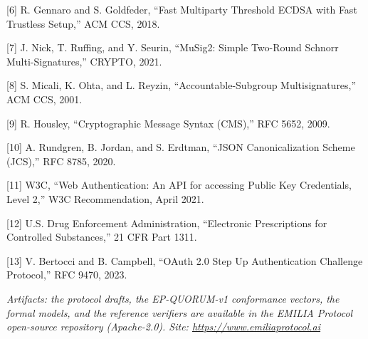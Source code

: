 \documentclass[
  11pt,
]{article}
\begin{document}
{[}6{]} R. Gennaro and S. Goldfeder, ``Fast Multiparty Threshold ECDSA
with Fast Trustless Setup,'' ACM CCS, 2018.

{[}7{]} J. Nick, T. Ruffing, and Y. Seurin, ``MuSig2: Simple Two-Round
Schnorr Multi-Signatures,'' CRYPTO, 2021.

{[}8{]} S. Micali, K. Ohta, and L. Reyzin, ``Accountable-Subgroup
Multisignatures,'' ACM CCS, 2001.

{[}9{]} R. Housley, ``Cryptographic Message Syntax (CMS),'' RFC 5652,
2009.

{[}10{]} A. Rundgren, B. Jordan, and S. Erdtman, ``JSON Canonicalization
Scheme (JCS),'' RFC 8785, 2020.

{[}11{]} W3C, ``Web Authentication: An API for accessing Public Key
Credentials, Level 2,'' W3C Recommendation, April 2021.

{[}12{]} U.S. Drug Enforcement Administration, ``Electronic
Prescriptions for Controlled Substances,'' 21 CFR Part 1311.

{[}13{]} V. Bertocci and B. Campbell, ``OAuth 2.0 Step Up Authentication
Challenge Protocol,'' RFC 9470, 2023.

\emph{Artifacts: the protocol drafts, the EP-QUORUM-v1 conformance
vectors, the formal models, and the reference verifiers are available in
the EMILIA Protocol open-source repository (Apache-2.0). Site:
\url{https://www.emiliaprotocol.ai}}
\end{document}
